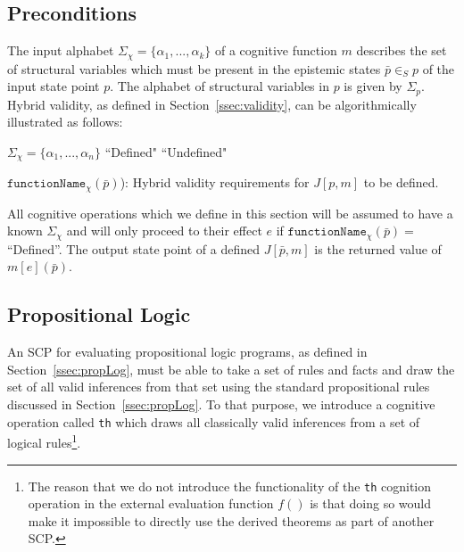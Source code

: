 \subsection{Preconditions}

The input alphabet $\Sigma_\chi=\{\alpha_1, ..., \alpha_k\}$ of a cognitive function $m$ describes the set of structural variables which must be present in the epistemic states $\bar{p} \in_S p$ of the input state point $p$. The alphabet of structural variables in $p$ is given by $\Sigma_p$. Hybrid validity, as defined in Section~\ref{ssec:validity}, can be algorithmically illustrated as follows:

\begin{algorithm}[H] 
\SetAlgoLined
{}
{
$\Sigma_{\chi}=\{\alpha_1,...,\alpha_n\}$\;
{
\Return ``Defined"
}
{
\Return ``Undefined"
}
}

\caption{$\texttt{functionName}_\chi(\bar{p})$): Hybrid validity requirements for $J[p,m]$ to be defined.}
\label{cogOp:precon}
\end{algorithm}

All cognitive operations which we define in this section will be assumed to have a known $\Sigma_\chi$ and will only proceed to their effect $e$ if $\texttt{functionName}_\chi(\bar{p})=$ ``Defined''.
The output state point of a defined $J[\bar{p},m]$ is the returned value of $m[e](\bar{p})$.

\subsection{Propositional Logic}
An SCP for evaluating propositional logic programs, as defined in Section~\ref{ssec:propLog}, must be able to take a set of rules and facts and draw the set of all valid inferences from that set using the standard propositional rules discussed in Section~\ref{ssec:propLog}. To that purpose, we introduce a cognitive operation called \texttt{th} which draws all classically valid inferences from a set of logical rules\footnote{The reason that we do not introduce the functionality of the \texttt{th} cognition operation in the external evaluation function $f()$ is that doing so would make it impossible to directly use the derived theorems as part of another SCP.}.

